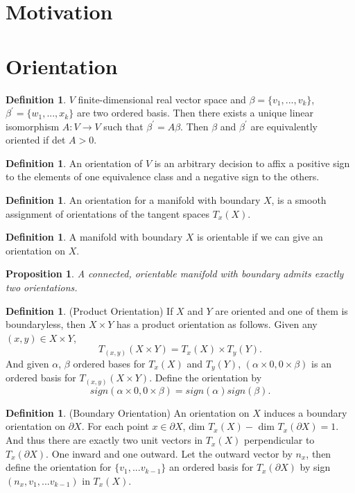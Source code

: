 \documentclass[psamsfonts]{amsart}
\newtheorem{prop}[theorem]{Proposition}
\theoremstyle{definition}
\newtheorem{defn}[theorem]{Definition}
\theoremstyle{remark}
\numberwithin{equation}{section}
\begin{document}
	\section{Motivation}

	\section{Orientation}
		\begin{defn}
			$V$ finite-dimensional real vector space and $\beta = \{v_1,...,v_k\}$, $\beta^\prime = \{w_1,...,x_k\}$ are two ordered basis. Then there exists a unique linear isomorphism $A: V \to V$ such that $\beta^\prime = A \beta$. Then $\beta$ and $\beta^\prime$ are equivalently oriented if det $A > 0$.
		\end{defn}
		\begin{defn}
			An orientation of $V$ is an arbitrary decision to affix a positive sign to the elements of one equivalence class and a negative sign to the others.
		\end{defn}
		\begin{defn}
			An orientation for a manifold with boundary $X$, is a smooth assignment of orientations of the tangent spaces $T_x(X)$.
		\end{defn}
		\begin{defn}
			A manifold with boundary $X$ is orientable if we can give an orientation on $X$.
		\end{defn}
		\begin{prop}
			A connected, orientable manifold with boundary admits exactly two orientations.
		\end{prop}
		\begin{defn}(Product Orientation)
			If $X$ and $Y$ are oriented and one of them is boundaryless, then $X \times Y$ has a product orientation as follows. Given any $(x,y) \in X \times Y$, 
			\begin{equation}
				T_{(x,y)}(X \times Y) = T_x(X) \times T_y(Y).
			\end{equation}
			And given $\alpha$, $\beta$ ordered bases for $T_x(X)$ and $T_y(Y)$, $(\alpha \times 0, 0\times \beta)$ is an ordered basis for $T_{(x,y)}(X \times Y)$. Define the orientation by
			\begin{equation}
				sign(\alpha \times 0, 0 \times \beta) = sign(\alpha)sign(\beta).	
			\end{equation}			 
		\end{defn}
		\begin{defn}(Boundary Orientation)
			An orientation on $X$ induces a boundary orientation on $\partial X$. For each point $x \in \partial X$, dim $T_x(X) -$ dim $T_x(\partial X) = 1$. And thus there are exactly two unit vectors in $T_x(X)$ perpendicular to $T_x(\partial X)$. One inward and one outward. Let the outward vector by $n_x$, then define the orientation for $\{v_1,...v_{k-1}\}$ an ordered basis for $T_x(\partial X)$ by sign$(n_x,v_1,...v_{k-1})$ in $T_x(X)$.
		\end{defn}
\end{document}
